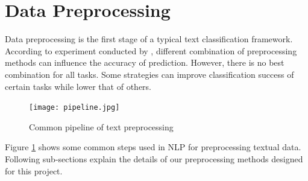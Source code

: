 \section{Data Preprocessing}
\label{sec:Preprocessing}
Data preprocessing is the first stage of a typical text classification framework. According to experiment conducted by \cite{uysal2014impact}, different combination of preprocessing methods can influence the accuracy of prediction. However, there is no best combination for all tasks. Some strategies can improve classification success of certain tasks while lower that of others.
\begin{figure}[!htbp]
    \centering
    \texttt{[image: pipeline.jpg]}
    \caption{Common pipeline of text preprocessing}
    \label{fig:pipeline}
\end{figure} 
Figure \ref{fig:pipeline} shows some common steps used in NLP for preprocessing textual data. Following sub-sections explain the details of our preprocessing methods designed for this project.
